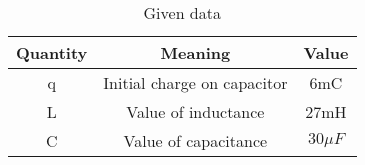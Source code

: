 \documentclass[12pt]{article}
\begin{document}
\begin{table}[h]
  \centering
  \begin{tabular}{|c|c|c|}
    \hline
    Quantity & Meaning & Value\\
    \hline
    q & Initial charge on capacitor & 6mC \\
    L & Value of inductance & 27mH \\
    C & Value of capacitance & $30\mu F$ \\
    \hline
  \end{tabular}
  \caption{Given data}
  \label{tab:mytable}
\end{table}
\end{document}
